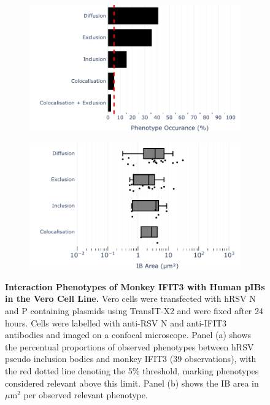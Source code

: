 \begin{figure}
    \begin{subfigure}{0.495\textwidth}
        \caption{}
        \includegraphics[width=1\linewidth]{09. Chapter 4/Figs/01. pIB/04. IFIT3/01. bar_i3_vero.pdf} 
    \end{subfigure}
    \begin{subfigure}{0.495\textwidth}
        \caption{}
        \includegraphics[width=1\linewidth]{09. Chapter 4/Figs/01. pIB/04. IFIT3/02. box_i3_vero.pdf}
    \end{subfigure}
    \caption[Interaction Phenotypes of Monkey IFIT3 with Human pIBs in the Vero Cell Line.]{\textbf{Interaction Phenotypes of Monkey IFIT3 with Human pIBs in the Vero Cell Line.} Vero cells were transfected with hRSV N and P containing plasmids using TransIT-X2 and were fixed after 24 hours. Cells were labelled with anti-RSV N and anti-IFIT3 antibodies and imaged on a confocal microscope. Panel (a) shows the percentual proportions of observed phenotypes between hRSV pseudo inclusion bodies and monkey IFIT3 (39 observations), with the red dotted line denoting the 5\% threshold, marking phenotypes considered relevant above this limit. Panel (b) shows the IB area in \(\mu \mbox{m}^2\) per observed relevant phenotype.}
    \label{fig:Interaction Phenotypes of Monkey IFIT3 with Human pIBs in the VERO Cell Line}
\end{figure}

